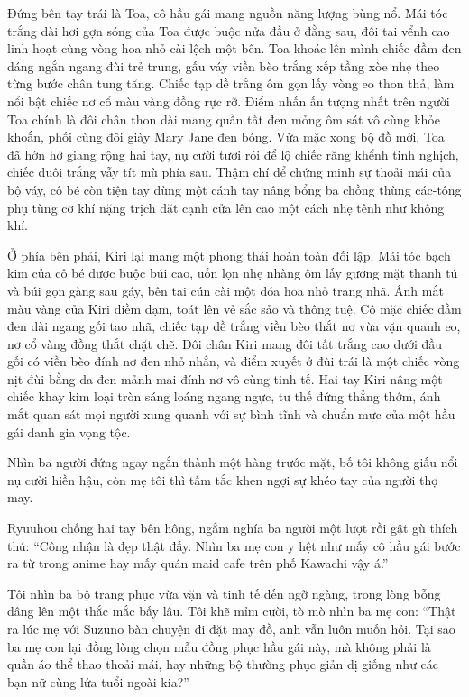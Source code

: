 \documentclass[../main.tex]{subfiles}
\begin{document}
Đứng bên tay trái là Toa, cô hầu gái mang nguồn năng lượng bùng nổ. Mái tóc trắng dài hơi gợn sóng của Toa được buộc nửa đầu ở đằng sau, đôi tai vểnh cao linh hoạt cùng vòng hoa nhỏ cài lệch một bên. Toa khoác lên mình chiếc đầm đen dáng ngắn ngang đùi trẻ trung, gấu váy viền bèo trắng xếp tầng xòe nhẹ theo từng bước chân tung tăng. Chiếc tạp dề trắng ôm gọn lấy vòng eo thon thả, làm nổi bật chiếc nơ cổ màu vàng đồng rực rỡ. Điểm nhấn ấn tượng nhất trên người Toa chính là đôi chân thon dài mang quần tất đen mỏng ôm sát vô cùng khỏe khoắn, phối cùng đôi giày Mary Jane đen bóng. Vừa mặc xong bộ đồ mới, Toa đã hớn hở giang rộng hai tay, nụ cười tươi rói để lộ chiếc răng khểnh tinh nghịch, chiếc đuôi trắng vẫy tít mù phía sau. Thậm chí để chứng minh sự thoải mái của bộ váy, cô bé còn tiện tay dùng một cánh tay nâng bổng ba chồng thùng các-tông phụ tùng cơ khí nặng trịch đặt cạnh cửa lên cao một cách nhẹ tênh như không khí.

Ở phía bên phải, Kiri lại mang một phong thái hoàn toàn đối lập. Mái tóc bạch kim của cô bé được buộc búi cao, uốn lọn nhẹ nhàng ôm lấy gương mặt thanh tú và búi gọn gàng sau gáy, bên tai cún cài một đóa hoa nhỏ trang nhã. Ánh mắt màu vàng của Kiri điềm đạm, toát lên vẻ sắc sảo và thông tuệ. Cô mặc chiếc đầm đen dài ngang gối tao nhã, chiếc tạp dề trắng viền bèo thắt nơ vừa vặn quanh eo, nơ cổ vàng đồng thắt chặt chẽ. Đôi chân Kiri mang đôi tất trắng cao dưới đầu gối có viền bèo đính nơ đen nhỏ nhắn, và điểm xuyết ở đùi trái là một chiếc vòng nịt đùi bằng da đen mảnh mai đính nơ vô cùng tinh tế. Hai tay Kiri nâng một chiếc khay kim loại tròn sáng loáng ngang ngực, tư thế đứng thẳng thớm, ánh mắt quan sát mọi người xung quanh với sự bình tĩnh và chuẩn mực của một hầu gái danh gia vọng tộc.

Nhìn ba người đứng ngay ngắn thành một hàng trước mặt, bố tôi không giấu nổi nụ cười hiền hậu, còn mẹ tôi thì tấm tắc khen ngợi sự khéo tay của người thợ may.

Ryuuhou chống hai tay bên hông, ngắm nghía ba người một lượt rồi gật gù thích thú: ``Công nhận là đẹp thật đấy. Nhìn ba mẹ con y hệt như mấy cô hầu gái bước ra từ trong anime hay mấy quán maid cafe trên phố Kawachi vậy á.''

Tôi nhìn ba bộ trang phục vừa vặn và tinh tế đến ngỡ ngàng, trong lòng bỗng dâng lên một thắc mắc bấy lâu. Tôi khẽ mỉm cười, tò mò nhìn ba mẹ con: ``Thật ra lúc mẹ với Suzuno bàn chuyện đi đặt may đồ, anh vẫn luôn muốn hỏi. Tại sao ba mẹ con lại đồng lòng chọn mẫu đồng phục hầu gái này, mà không phải là quần áo thể thao thoải mái, hay những bộ thường phục giản dị giống như các bạn nữ cùng lứa tuổi ngoài kia?''
\end{document}
